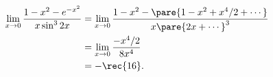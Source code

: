 \documentclass{ctexart}
\begin{document}
\begin{align*}
    \lim_{x\rightarrow 0} \frac{1-x^2 - e^{-x^2}}{x \sin^3 2x} &= \lim_{x\rightarrow 0} \frac{1-x^2 - \pare{1 - x^2 + x^4/2 + \cdots}}{x\pare{2x+\cdots}^3} \\
    &= \lim_{x\rightarrow 0} \frac{-x^4/2}{8x^4} \\
    &= -\rec{16}.
\end{align*}
\end{document}
